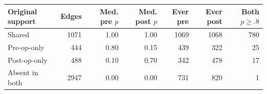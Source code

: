 \begin{tabular}{lrrrrrr}
\toprule
Original support & Edges & Med. pre $p$ & Med. post $p$ & Ever pre & Ever post & Both $p\geq.8$ \\
\midrule
Shared & 1071 & 1.00 & 1.00 & 1069 & 1068 & 780 \\
Pre-op-only & 444 & 0.80 & 0.15 & 439 & 322 & 25 \\
Post-op-only & 488 & 0.10 & 0.70 & 342 & 478 & 17 \\
Absent in both & 2947 & 0.00 & 0.00 & 731 & 820 & 1 \\
\bottomrule
\end{tabular}
